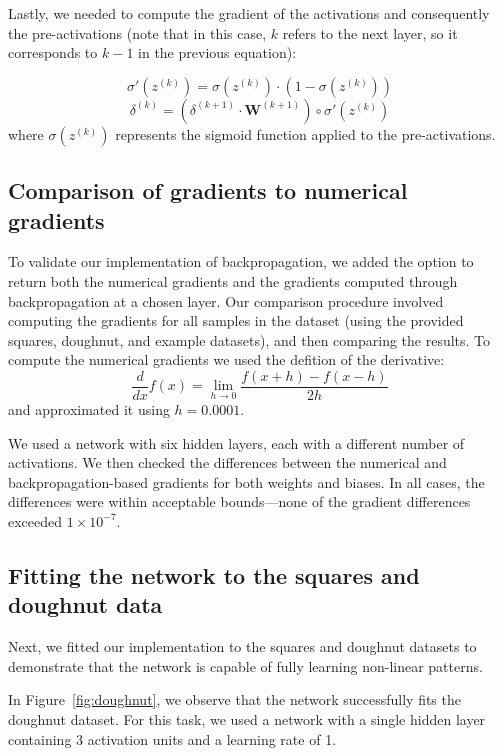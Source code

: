 \documentclass[9pt]{IEEEtran}
\begin{document}
Lastly, we needed to compute the gradient of the activations and consequently the pre-activations 
(note that in this case, \(k\) refers to the next layer, so it corresponds to \(k-1\) in the
 previous equation):

\[
\sigma'(z^{(k)}) = \sigma(z^{(k)}) \cdot \left(1 - \sigma(z^{(k)})\right)
\]
\[
\delta^{(k)} = \left( \delta^{(k+1)} \cdot \mathbf{W}^{(k+1)} \right) \circ \sigma'(z^{(k)})
\]
where \( \sigma(z^{(k)}) \) represents the sigmoid function applied to the pre-activations.

\subsection{Comparison of gradients to numerical gradients}
To validate our implementation of backpropagation, we added the option to return both 
the numerical gradients and the gradients computed through backpropagation at a chosen
 layer. Our comparison procedure involved computing the gradients for all samples in the 
 dataset (using the provided squares, doughnut, and example datasets), and then comparing 
 the results. To compute the numerical gradients we used the defition of the derivative:
 \[
 \frac{d}{dx} f(x) = \lim_{h \to 0} \frac{f(x+h) - f(x - h)}{2h}
 \]
and approximated it using $h=0.0001$.

We used a network with six hidden layers, each with a different number of 
activations. We then checked the differences between the
 numerical and backpropagation-based gradients for both weights
  and biases. In all cases, the differences were within acceptable
   bounds—none of the gradient differences exceeded \(1 \times 10^{-7}\).

\subsection{Fitting the network to the squares and doughnut data}
Next, we fitted our implementation to the squares and doughnut datasets to 
demonstrate that the network is capable of fully learning non-linear patterns.

In Figure~\ref{fig:doughnut}, we observe that the network successfully fits the doughnut dataset. 
For this task, we used a network with a single hidden layer
 containing 3 activation units and a learning rate of 1.
\end{document}
